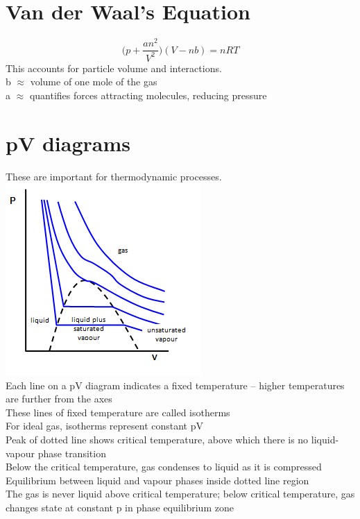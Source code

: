 \documentclass[a4paper, 11pt, fleqn, normalem]{report}
\begin{document}
\section{Van der Waal's Equation}
\vspace{-22pt}
\begin{equation*}
	\Big(p+\frac{an^{2}}{V^{2}}\Big)(V-nb) = nRT
\end{equation*}
This accounts for particle volume and interactions. \\
b $\approx$ volume of one mole of the gas \\
a $\approx$ quantifies forces attracting molecules, reducing pressure

\section{pV diagrams}
These are important for thermodynamic processes. \\
\includegraphics{pV.png} \\
Each line on a pV diagram indicates a fixed temperature -- higher temperatures are further from the axes \\
These lines of fixed temperature are called isotherms \\
For ideal gas, isotherms represent constant pV \\
Peak of dotted line shows critical temperature, above which there is no liquid-vapour phase transition \\
Below the critical temperature, gas condenses to liquid as it is compressed \\
Equilibrium between liquid and vapour phases inside dotted line region \\
The gas is never liquid above critical temperature; below critical temperature, gas changes state at constant p in phase equilibrium zone
\end{document}
